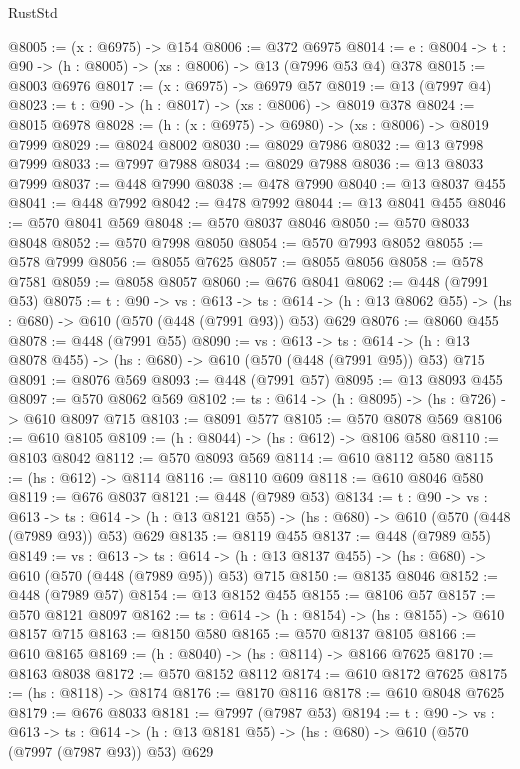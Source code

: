 \begin{lexlean}{RustStd}
\begin{coremodule}
@8005 := (x : @6975) -> @154
@8006 := @372 @6975
@8014 := {e : @8004} -> {t : @90} -> (h : @8005) -> (xs : @8006) -> @13 (@7996 @53 @4) @378
@8015 := @8003 @6976
@8017 := (x : @6975) -> @6979 @57
@8019 := @13 (@7997 @4)
@8023 := {t : @90} -> (h : @8017) -> (xs : @8006) -> @8019 @378
@8024 := @8015 @6978
@8028 := (h : (x : @6975) -> @6980) -> (xs : @8006) -> @8019 @7999
@8029 := @8024 @8002
@8030 := @8029 @7986
@8032 := @13 @7998 @7999
@8033 := @7997 @7988
@8034 := @8029 @7988
@8036 := @13 @8033 @7999
@8037 := @448 @7990
@8038 := @478 @7990
@8040 := @13 @8037 @455
@8041 := @448 @7992
@8042 := @478 @7992
@8044 := @13 @8041 @455
@8046 := @570 @8041 @569
@8048 := @570 @8037 @8046
@8050 := @570 @8033 @8048
@8052 := @570 @7998 @8050
@8054 := @570 @7993 @8052
@8055 := @578 @7999
@8056 := @8055 @7625
@8057 := @8055 @8056
@8058 := @578 @7581
@8059 := @8058 @8057
@8060 := @676 @8041
@8062 := @448 (@7991 @53)
@8075 := {t : @90} ->
  {vs : @613} ->
  {ts : @614} -> (h : @13 @8062 @55) -> (hs : @680) -> @610 (@570 (@448 (@7991 @93)) @53) @629
@8076 := @8060 @455
@8078 := @448 (@7991 @55)
@8090 := {vs : @613} ->
  {ts : @614} -> (h : @13 @8078 @455) -> (hs : @680) -> @610 (@570 (@448 (@7991 @95)) @53) @715
@8091 := @8076 @569
@8093 := @448 (@7991 @57)
@8095 := @13 @8093 @455
@8097 := @570 @8062 @569
@8102 := {ts : @614} -> (h : @8095) -> (hs : @726) -> @610 @8097 @715
@8103 := @8091 @577
@8105 := @570 @8078 @569
@8106 := @610 @8105
@8109 := (h : @8044) -> (hs : @612) -> @8106 @580
@8110 := @8103 @8042
@8112 := @570 @8093 @569
@8114 := @610 @8112 @580
@8115 := (hs : @612) -> @8114
@8116 := @8110 @609
@8118 := @610 @8046 @580
@8119 := @676 @8037
@8121 := @448 (@7989 @53)
@8134 := {t : @90} ->
  {vs : @613} ->
  {ts : @614} -> (h : @13 @8121 @55) -> (hs : @680) -> @610 (@570 (@448 (@7989 @93)) @53) @629
@8135 := @8119 @455
@8137 := @448 (@7989 @55)
@8149 := {vs : @613} ->
  {ts : @614} -> (h : @13 @8137 @455) -> (hs : @680) -> @610 (@570 (@448 (@7989 @95)) @53) @715
@8150 := @8135 @8046
@8152 := @448 (@7989 @57)
@8154 := @13 @8152 @455
@8155 := @8106 @57
@8157 := @570 @8121 @8097
@8162 := {ts : @614} -> (h : @8154) -> (hs : @8155) -> @610 @8157 @715
@8163 := @8150 @580
@8165 := @570 @8137 @8105
@8166 := @610 @8165
@8169 := (h : @8040) -> (hs : @8114) -> @8166 @7625
@8170 := @8163 @8038
@8172 := @570 @8152 @8112
@8174 := @610 @8172 @7625
@8175 := (hs : @8118) -> @8174
@8176 := @8170 @8116
@8178 := @610 @8048 @7625
@8179 := @676 @8033
@8181 := @7997 (@7987 @53)
@8194 := {t : @90} ->
  {vs : @613} ->
  {ts : @614} -> (h : @13 @8181 @55) -> (hs : @680) -> @610 (@570 (@7997 (@7987 @93)) @53) @629

\end{coremodule}
\end{lexlean}
